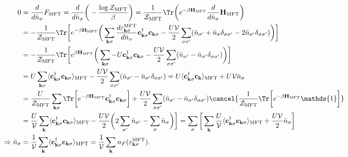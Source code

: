 \begin{align*}
    0 &= \frac{d}{d \bar{n}_{\sigma}} F_{\textnormal{MFT}} = \frac{d}{d \bar{n}_{\sigma}} \bigg( - \frac{\log \mathcal{Z}_{\textnormal{MFT}}}{\beta} \bigg) = \frac{1}{\mathcal{Z}_{\textnormal{MFT}}} \Tr \bigg(e^{-\beta {\bf H}_{\textnormal{MFT}}} \frac{d}{d\bar{n}_{\sigma}} {\bf H}_{\textnormal{MFT}} \bigg) \\
    &= - \frac{1}{\mathcal{Z}_{\textnormal{MFT}}} \Tr \bigg[e^{-\beta {\bf H}_{\textnormal{MFT}}} \bigg(\sum_{{\bf k}\sigma} \frac{d \varepsilon_{{\bf k} \sigma}^{\textnormal{MFT}}}{d \bar{n}_{\sigma}} {\bf c}_{{\bf k}\sigma}^\dagger {\bf c}_{{\bf k}\sigma} - \frac{U  \mathcal{V}}{2} \sum_{\sigma \sigma'} ({\bar n}_{\sigma'} + \bar{n}_{\sigma} \delta_{\sigma \sigma'} -2 \bar{n}_{\sigma'} \delta_{\sigma \sigma'} ) \bigg) \bigg] \\
    &= - \frac{1}{\mathcal{Z}_{\textnormal{MFT}}} \Tr \bigg[e^{\beta {\bf H}_{\textnormal{MFT}}} \bigg(\sum_{{\bf k}\sigma} -U {\bf c}_{{\bf k}\sigma}^\dagger {\bf c}_{{\bf k}\sigma}  - \frac{U  \mathcal{V}}{2} \sum_{\sigma \sigma'} ({\bar n}_{\sigma'} - \bar{n}_{\sigma'} \delta_{\sigma \sigma'} ) \bigg) \bigg] \\
    &= U \sum_{{\bf k} \sigma} \langle {\bf c}_{{\bf k}\sigma}^\dagger {\bf c}_{{\bf k}\sigma} \rangle_{\textnormal{MFT}} - \frac{U  \mathcal{V}}{2} \sum_{\sigma \sigma'} ({\bar n}_{\sigma'} - \bar{n}_{\sigma'} \delta_{\sigma \sigma'} ) =  U \langle {\bf c}_{{\bf k}\sigma}^\dagger {\bf c}_{{\bf k}} \rangle_{\textnormal{MFT}} + U \mathcal{V} \bar{n}_{\sigma} \\
    &= \frac{U}{\mathcal{Z}_{\textnormal{MFT}}} \sum_{{\bf k} \sigma} \Tr \bigg[e^{-\beta {\bf H}_{\textnormal{MFT}}} {\bf c}_{{\bf k}\sigma}^\dagger {\bf c}_{{\bf k}\sigma} \bigg] + \frac{U  \mathcal{V}}{2} \sum_{\sigma \sigma'} ({\bar n}_{\sigma'} - \bar{n}_{\sigma'} \delta_{\sigma \sigma'}) \cancel{\frac{1}{\mathcal{Z}_{\textnormal{MFT}}} \Tr \bigg[e^{-\beta {\bf H}_{\textnormal{MFT}}} \mathds{1} \bigg]} \\
    &= \frac{U}{\mathcal{V}} \sum_{{\bf k}} \langle {\bf c}_{{\bf k}\sigma}^\dagger {\bf c}_{{\bf k}\sigma} \rangle_{\textnormal{MFT}} - \frac{U \mathcal{V}}{2} \bigg( 2 \sum_{\sigma'} {\bar n}_{\sigma'} - \sum_{\sigma} {\bar n}_{\sigma} \bigg) \bigg] =  \sum_{\sigma} \bigg[ \sum_{{\bf k}} \frac{U}{\mathcal{V}} \langle {\bf c}_{{\bf k}\sigma}^\dagger {\bf c}_{{\bf k}\sigma} \rangle_{\textnormal{MFT}} + \frac{U \mathcal{V}}{2} {\bar{ n}_{\sigma}} \bigg]\\
    \Rightarrow \bar{n}_{\sigma} &= \frac{1}{\mathcal{V}} \sum_{{\bf k}} \langle {\bf c}_{{\bf k}\sigma}^\dagger {\bf c}_{{\bf k}\sigma} \rangle_{\textnormal{MFT}} = \frac{1}{\mathcal{V}} \sum_{{\bf k}} n_F(\varepsilon_{{\bf k} \sigma}^{\textnormal{MFT}}).
\end{align*}

